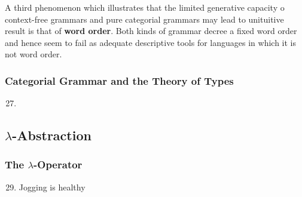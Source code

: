 \documentclass[11pt]{article}
\begin{document}
A third phenomenon which illustrates that the limited generative capacity o
context-free grammars and pure categorial grammars may lead to unituitive
result is that of \textbf{word order}. Both kinds of grammar decree a fixed word
order and hence seem to fail as adequate descriptive tools for languages in
which it is not word order.
\subsubsection{Categorial Grammar and the Theory of Types}
\label{sec:org2ada5df}
\begin{enumerate}
\setcounter{enumi}{26}
\item {}
\end{enumerate}
\subsection{\(λ\)-Abstraction}
\label{sec:org994edd1}
\subsubsection{The \(λ\)-Operator}
\label{sec:orgc9eaf0a}
\begin{enumerate}
\setcounter{enumi}{28}
\item Jogging is healthy
\end{enumerate}
\end{document}
